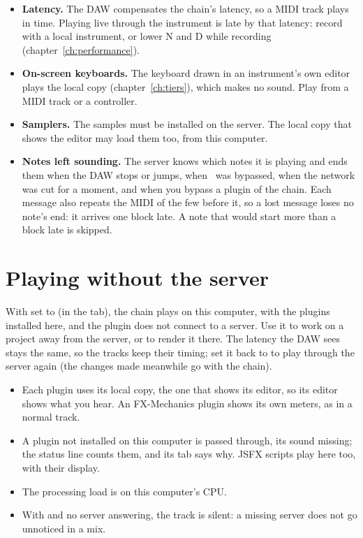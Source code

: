 \begin{itemize}
  \item \textbf{Latency.} The DAW compensates the chain's latency, so a MIDI
    track plays in time. Playing live through the instrument is late by
    that latency: record with a local instrument, or lower N and D while
    recording (chapter~\ref{ch:performance}).
  \item \textbf{On-screen keyboards.} The keyboard drawn in an instrument's
    own editor plays the local copy (chapter~\ref{ch:tiers}), which
    makes no sound. Play from a MIDI track or a controller.
  \item \textbf{Samplers.} The samples must be installed on the server. The
    local copy that shows the editor may load them too, from this computer.
  \item \textbf{Notes left sounding.} The server knows which notes it is
    playing and ends them when the DAW stops or jumps, when \fxme\ was
    bypassed, when the network was cut for a moment, and when you bypass a
    plugin of the chain. Each message also repeats the MIDI of the few
    before it, so a lost message loses no note's end: it arrives one block
    late. A note that would start more than a block late is skipped.
\end{itemize}

\section{Playing without the server}
\label{sec:local}

With  set to  (in the  tab), the chain
plays on this computer, with the plugins installed here, and the plugin does
not connect to a server. Use it to work on a project away from the server,
or to render it there. The latency the DAW sees stays the same, so the
tracks keep their timing; set it back to  to play through the
server again (the changes made meanwhile go with the chain).

\begin{itemize}
  \item Each plugin uses its local copy, the one that shows its editor, so
    its editor shows what you hear. An FX-Mechanics plugin shows its own
    meters, as in a normal track.
  \item A plugin not installed on this computer is passed through, its
    sound missing; the status line counts them, and its 
    tab says why. JSFX scripts play here too, with their display.
  \item The processing load is on this computer's CPU.
  \item With  and no server answering, the track is silent:
    a missing server does not go unnoticed in a mix.
\end{itemize}

